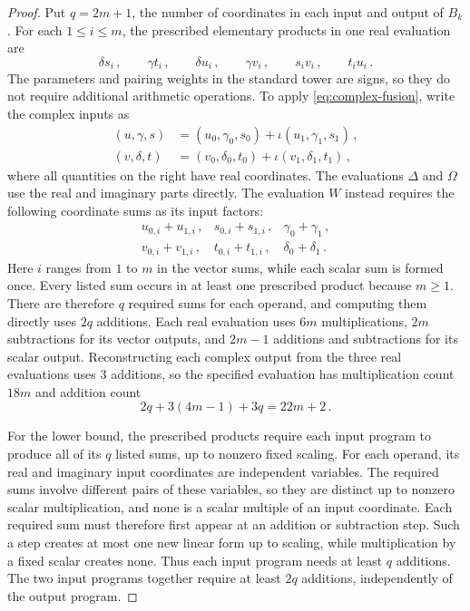 \documentclass[11pt,reqno]{amsart}
\numberwithin{equation}{section}
\begin{document}
\begin{proof}
Put $q=2m+1$, the number of coordinates in each input and output of
$B_k$. For each $1\le i\le m$, the prescribed elementary products in
one real evaluation are
\[
\delta s_i\,,\qquad\gamma t_i\,,\qquad
\delta u_i\,,\qquad\gamma v_i\,,\qquad
s_iv_i\,,\qquad t_iu_i\,.
\]
The parameters and pairing weights in the standard tower are signs,
so they do not require additional arithmetic operations. To apply
\eqref{eq:complex-fusion}, write the complex inputs as
\[
\begin{aligned}
(u,\gamma,s)&=(u_0,\gamma_0,s_0)
              +\iota(u_1,\gamma_1,s_1)\,,\\
(v,\delta,t)&=(v_0,\delta_0,t_0)
              +\iota(v_1,\delta_1,t_1)\,,
\end{aligned}
\]
where all quantities on the right have real coordinates. The evaluations
$\Delta$ and $\Omega$ use the real and imaginary parts directly. The
evaluation $W$ instead requires the following coordinate sums as its
input factors:
\[
\begin{array}{lll}
u_{0,i}+u_{1,i}\,,&s_{0,i}+s_{1,i}\,,&\gamma_0+\gamma_1\,,\\
v_{0,i}+v_{1,i}\,,&t_{0,i}+t_{1,i}\,,&\delta_0+\delta_1\,.
\end{array}
\]
Here $i$ ranges from $1$ to $m$ in the vector sums, while each scalar
sum is formed once. Every listed sum occurs in at least one prescribed
product because $m\ge1$. There are therefore $q$ required sums for
each operand, and computing them directly uses $2q$ additions.
Each real evaluation
uses $6m$ multiplications, $2m$ subtractions for its vector outputs, and
$2m-1$ additions and subtractions for its scalar output. Reconstructing
each complex output from the three real evaluations uses $3$ additions,
so the specified evaluation has multiplication count $18m$ and addition
count
\[
2q+3(4m-1)+3q=22m+2\,.
\]

For the lower bound, the prescribed products require each input program
to produce all of its $q$ listed sums, up to nonzero fixed scaling. For
each operand, its real and imaginary input coordinates are independent
variables. The required sums involve different pairs of these variables,
so they are distinct up to nonzero scalar multiplication, and none is a
scalar multiple of an input coordinate. Each required sum must therefore
first appear at an addition or subtraction step. Such a step creates at
most one new linear form up to scaling, while multiplication by a fixed
scalar creates none. Thus each input program needs at least $q$ additions.
The two input programs together require at least $2q$ additions,
independently of the output program.


\end{proof}
\end{document}

